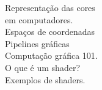 \documentclass[preview]{standalone}
\begin{document}
Representação das cores \\ em computadores.\\Espaços de coordenadas\\Pipelines gráficas\\Computação gráfica 101.\\O que é um shader?\\Exemplos de shaders.\\
\end{document}
